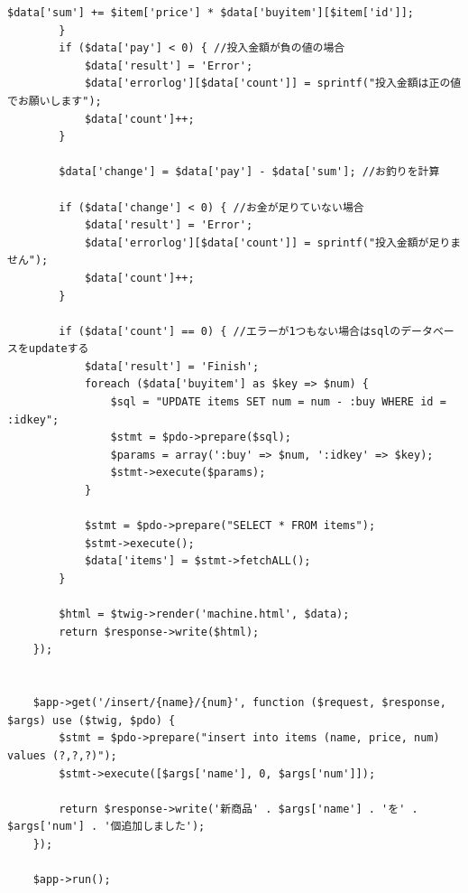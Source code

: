 \documentclass[12pt]{jarticle}
\begin{document}
\begin{lstlisting}[style = lstphp,caption=課題2のindex.php]
            $data['sum'] += $item['price'] * $data['buyitem'][$item['id']];
        }
        if ($data['pay'] < 0) { //投入金額が負の値の場合
            $data['result'] = 'Error';
            $data['errorlog'][$data['count']] = sprintf("投入金額は正の値でお願いします");
            $data['count']++;
        }
    
        $data['change'] = $data['pay'] - $data['sum']; //お釣りを計算
    
        if ($data['change'] < 0) { //お金が足りていない場合
            $data['result'] = 'Error';
            $data['errorlog'][$data['count']] = sprintf("投入金額が足りません");
            $data['count']++;
        }
    
        if ($data['count'] == 0) { //エラーが1つもない場合はsqlのデータベースをupdateする
            $data['result'] = 'Finish';
            foreach ($data['buyitem'] as $key => $num) {
                $sql = "UPDATE items SET num = num - :buy WHERE id = :idkey";
                $stmt = $pdo->prepare($sql);
                $params = array(':buy' => $num, ':idkey' => $key);
                $stmt->execute($params);
            }
    
            $stmt = $pdo->prepare("SELECT * FROM items");
            $stmt->execute();
            $data['items'] = $stmt->fetchALL();
        }
    
        $html = $twig->render('machine.html', $data);
        return $response->write($html);
    });
    
    
    $app->get('/insert/{name}/{num}', function ($request, $response, $args) use ($twig, $pdo) {
        $stmt = $pdo->prepare("insert into items (name, price, num) values (?,?,?)");
        $stmt->execute([$args['name'], 0, $args['num']]);
    
        return $response->write('新商品' . $args['name'] . 'を' . $args['num'] . '個追加しました');
    });
    
    $app->run();
    
    \end{lstlisting}















\end{document}

